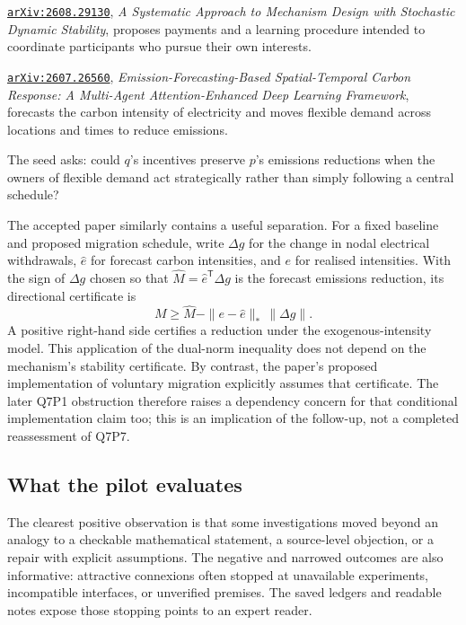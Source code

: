 \documentclass[11pt,a4paper]{article}
\renewenvironment{quote}{\tcolorbox[pairpanel]}{\endtcolorbox}
\newcommand{\pl}[1]{\noindent\llap{\makebox[1.5em][l]{\color{accent}\(#1\)}}}
\newcommand{\pair}[1]{\mbox{#1}}
\newcommand{\file}[1]{\texttt{#1}}
\begin{document}
\begin{quote}
\pl{q}\href{https://arxiv.org/abs/2608.29130}{\file{arXiv:2608.29130}},
\emph{A Systematic Approach to Mechanism Design with Stochastic Dynamic
Stability}, proposes payments and a learning procedure intended to coordinate
participants who pursue their own interests.

\pl{p}\href{https://arxiv.org/abs/2607.26560}{\file{arXiv:2607.26560}},
\emph{Emission-Forecasting-Based Spatial-Temporal Carbon Response: A Multi-Agent
Attention-Enhanced Deep Learning Framework}, forecasts the carbon intensity
of electricity and moves flexible demand across locations and times to
reduce emissions.

The seed asks: could \(q\)'s incentives preserve \(p\)'s emissions reductions
when the owners of flexible demand act strategically rather than simply
following a central schedule?
\end{quote}

The accepted paper similarly contains a useful separation. For a fixed
baseline and proposed migration schedule, write $\Delta g$ for the change in
nodal electrical withdrawals, $\widehat e$ for forecast carbon intensities, and
$e$ for realised intensities. With the sign of $\Delta g$ chosen so that
$\widehat M=\widehat e^{\mathsf T}\Delta g$ is the forecast emissions reduction,
its directional certificate is
\begin{equation}
 M\geq\widehat M-\|e-\widehat e\|_*\,\|\Delta g\|.
 \label{eq:pilot-carbon}
\end{equation}
A positive right-hand side certifies a reduction under the exogenous-intensity
model. This application of the dual-norm inequality does not depend on the
mechanism's stability certificate. By contrast, the paper's proposed
implementation of voluntary migration explicitly assumes that certificate. The
later \pair{Q7P1} obstruction therefore raises a dependency concern for that
conditional implementation claim too; this is an implication of the follow-up,
not a completed reassessment of \pair{Q7P7}.

\subsection{What the pilot evaluates}

The clearest positive observation is that some investigations moved beyond an
analogy to a checkable mathematical statement, a source-level objection, or a
repair with explicit assumptions. The negative and narrowed outcomes are also
informative: attractive connexions often stopped at unavailable experiments,
incompatible interfaces, or unverified premises. The saved ledgers and readable
notes expose those stopping points to an expert reader.
\end{document}
